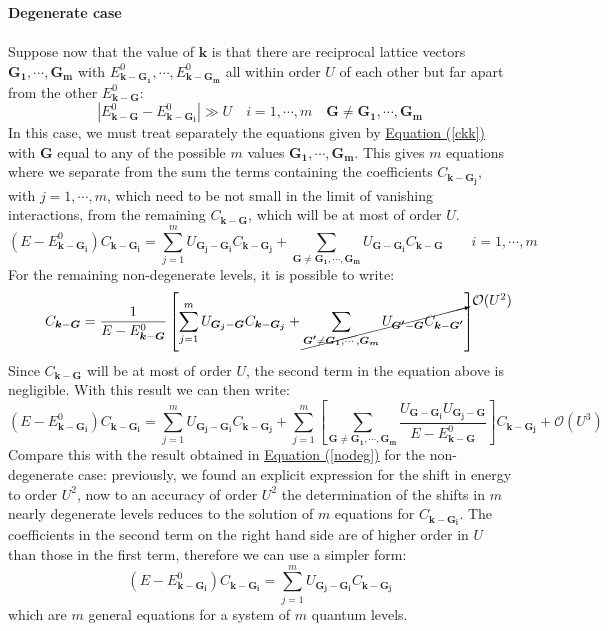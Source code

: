 \documentclass[10.75pt,a4paper,openright,bottom=2cm]{article}
\renewcommand{\Vec}[1]{\boldsymbol{#1}}
\renewcommand{\refeq}[1]{\hyperref[#1]{Equation (\ref{#1})}}
\begin{document}
\textbf{Degenerate case}\\\\
Suppose now that the value of $\Vec{k}$ is that there are reciprocal lattice vectors $\Vec{G_1},\cdots, \Vec{G_m}$ with $E^0_{\Vec{k}-\Vec{G_1}},\cdots,E^0_{\Vec{k}-\Vec{G_m}}$ all within order $U$ of each other but far apart from the other $E^0_{\Vec{k}-\Vec{G}}$:
\[
|E^0_{\Vec{k}-\Vec{G}}-E^0_{\Vec{k}-\Vec{G_i}}|\gg U \quad i=1,\cdots,m \quad \Vec{G}\neq\Vec{G_1},\cdots,\Vec{G_m}
\]
In this case, we must treat separately the equations given by \refeq{ckk} with $\Vec{G}$ equal to any of the possible $m$ values $\Vec{G_1},\cdots,\Vec{G_m}$. This gives $m$ equations where we separate from the sum the terms containing the coefficients $C_{\Vec{k}-\Vec{G_j}}$, with $j=1,\cdots,m$, which need to be not small in the limit of vanishing interactions, from the remaining $C_{\Vec{k}-\Vec{G}}$, which will be at most of order $U$.
\[
(E-E^0_{\Vec{k}-\Vec{G_i}})C_{\Vec{k}-\Vec{G_i}}=\sum_{j=1}^mU_{\Vec{G_j}-\Vec{G_i}}C_{\Vec{k}-\Vec{G_j}}+\sum_{\Vec{G}\neq\Vec{G_1},\cdots,\Vec{G_m}}U_{\Vec{G}-\Vec{G_i}}C_{\Vec{k}-\Vec{G}} \qquad i=1,\cdots,m
\]
For the remaining non-degenerate levels, it is possible to write:
\[
C_{\Vec{k}-\Vec{G}}=\frac{1}{E-E^0_{\Vec{k}-\Vec{G}}}\left[\sum_{j=1}^mU_{\Vec{G_j}-\Vec{G}}C_{\Vec{k}-\Vec{G_j}}+\cancelto{\mathcal{O}(U^2)}{\sum_{\Vec{G'}\neq\Vec{G_1},\cdots,\Vec{G_m}}U_{\Vec{G'}-\Vec{G}}C_{\Vec{k}-\Vec{G'}}}\right]
\]
Since $C_{\Vec{k}-\Vec{G}}$ will be at most of order $U$, the second term in the equation above is negligible. With this result we can then write:
\[
(E-E^0_{\Vec{k}-\Vec{G_i}})C_{\Vec{k}-\Vec{G_i}}=\sum_{j=1}^mU_{\Vec{G_j}-\Vec{G_i}}C_{\Vec{k}-\Vec{G_j}}+\sum_{j=1}^m\left[\sum_{\Vec{G}\neq\Vec{G_1},\cdots,\Vec{G_m}}\frac{U_{\Vec{G}-\Vec{G_i}}U_{\Vec{G_j}-\Vec{G}}}{E-E^0_{\Vec{k}-\Vec{G}}}\right]C_{\Vec{k}-\Vec{G_j}}+\mathcal{O}(U^3)
\]
Compare this with the result obtained in \refeq{nodeg} for the non-degenerate case: previously, we found an explicit expression for the shift in energy to order $U^2$, now to an accuracy of order $U^2$ the determination of the shifts in $m$ nearly degenerate levels reduces to the solution of $m$ equations for $C_{\Vec{k}-\Vec{G_i}}$. The coefficients in the second term on the right hand side are of higher order in $U$ than those in the first term, therefore we can use a simpler form:
\[
(E-E^0_{\Vec{k}-\Vec{G_i}})C_{\Vec{k}-\Vec{G_i}}=\sum_{j=1}^mU_{\Vec{G_j}-\Vec{G_i}}C_{\Vec{k}-\Vec{G_j}}
\]
which are $m$ general equations for a system of $m$ quantum levels. 
\newpage
\end{document}
